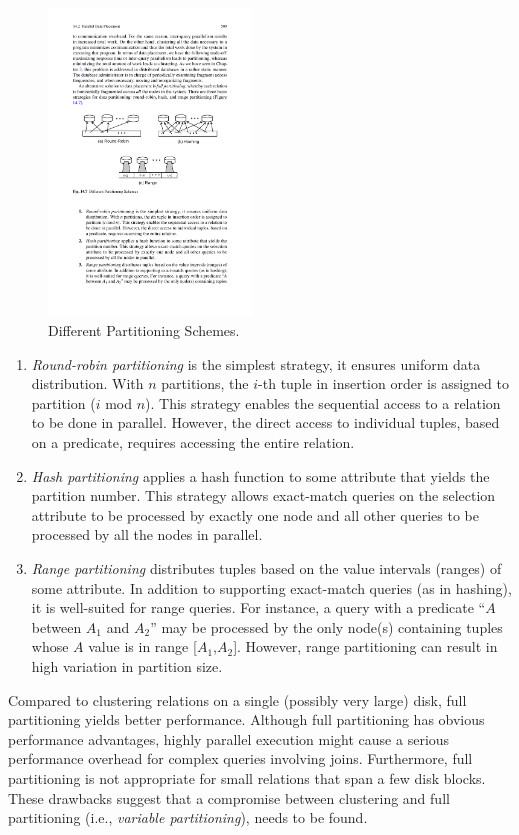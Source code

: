 \documentclass{vldb}
\newcommand{\be}{\begin{enumerate}}
\newcommand{\ee}{\end{enumerate}}
\newcommand{\ii}{\item}
\begin{document}
\begin{figure}[htb]
\centering
\includegraphics[width=0.48\textwidth]{partitioning}
\caption{Different Partitioning Schemes.}
\label{fig:partitioning}
\end{figure}
\be
\ii \textit{Round-robin partitioning} is the simplest strategy, it ensures uniform data distribution. 
With $n$ partitions, the $i$-th tuple in insertion order is assigned to partition ($i$ mod $n$). 
This strategy enables the sequential access to a relation to be done in parallel. However, the direct access to individual tuples, based on a predicate, requires accessing the entire relation.
\ii \textit{Hash partitioning} applies a hash function to some attribute that yields the partition number. This strategy allows exact-match queries on the selection attribute to be processed by exactly one node and all other queries to be processed by all the nodes in parallel.
\ii \textit{Range partitioning} distributes tuples based on the value intervals (ranges) of some attribute. In addition to supporting exact-match queries (as in hashing), it is well-suited for range queries. For instance, a query with a predicate “$A$ between $A_1$ and $A_2$” may be processed by the only node(s) containing tuples whose $A$ value is in range [$A_1$,$A_2$]. However, range partitioning can result in high variation in partition size.
\ee

Compared to clustering relations on a single (possibly very large) disk, full partitioning yields better performance. Although full partitioning has obvious performance advantages, highly parallel execution might cause a serious performance overhead for complex queries involving joins. Furthermore, full partitioning is not appropriate for small relations that span a few disk blocks. These drawbacks suggest that a compromise between clustering and full partitioning (i.e., \textit{variable partitioning}), needs to be found.
\end{document}

